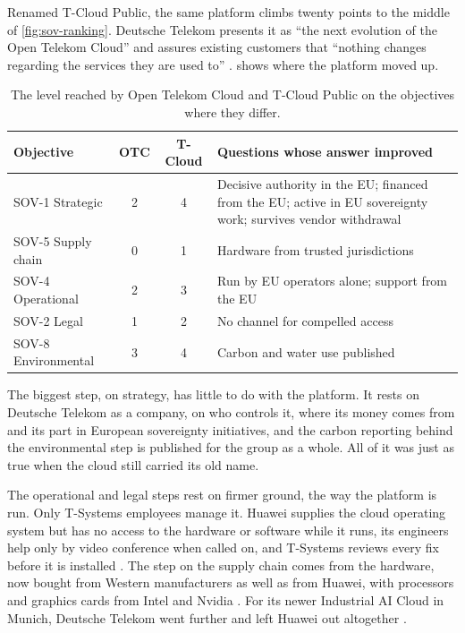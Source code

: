Renamed T-Cloud Public, the same platform climbs twenty points to the middle of
\cref{fig:sov-ranking}. Deutsche Telekom presents it as \enquote{the next
evolution of the Open Telekom Cloud} and assures existing customers that
\enquote{nothing changes regarding the services they are used to}
\cite{TCloudPublic_2026}.  shows where the platform moved up.

\begin{table}[htbp]
  \centering
  \caption{The level reached by Open Telekom Cloud and T-Cloud Public on the
           objectives where they differ.}
  \label{tab:otc-tcloud}
  \small
  \begin{tabularx}{\textwidth}{@{}l c c X@{}}
    \toprule
    \textbf{Objective} & \textbf{OTC} & \textbf{T-Cloud}
      & \textbf{Questions whose answer improved} \\
    \midrule
    SOV-1 Strategic     & 2 & 4 & Decisive authority in the \acs{EU};
                                  financed from the \acs{EU}; active in
                                  \acs{EU} sovereignty work; survives
                                  vendor withdrawal \\
    SOV-5 Supply chain  & 0 & 1 & Hardware from trusted jurisdictions \\
    SOV-4 Operational   & 2 & 3 & Run by \acs{EU} operators alone;
                                  support from the \acs{EU} \\
    SOV-2 Legal         & 1 & 2 & No channel for compelled access \\
    SOV-8 Environmental & 3 & 4 & Carbon and water use published \\
    \bottomrule
  \end{tabularx}
\end{table}

The biggest step, on strategy, has little to do with the platform. It rests on
Deutsche Telekom as a company, on who controls it, where its money comes from and
its part in European sovereignty initiatives, and the carbon reporting behind the
environmental step is published for the group as a whole. All of it was just as
true when the cloud still carried its old name.

The operational and legal steps rest on firmer ground, the way the platform is
run. Only T-Systems employees manage it. Huawei supplies the cloud operating
system but has no access to the hardware or software while it runs, its
engineers help only by video conference when called on, and T-Systems reviews
every fix before it is installed \cite{TCloudPublic_SecureCloud}. The step on the
supply chain comes from the hardware, now bought from Western manufacturers as
well as from Huawei, with processors and graphics cards from Intel and Nvidia
\cite{TCloudPublic_SecureCloud,LightReading_DT_2025}. For its newer Industrial
\acs{AI} Cloud in Munich, Deutsche Telekom went further and left Huawei out
altogether \cite{LightReading_DT_2026}.

